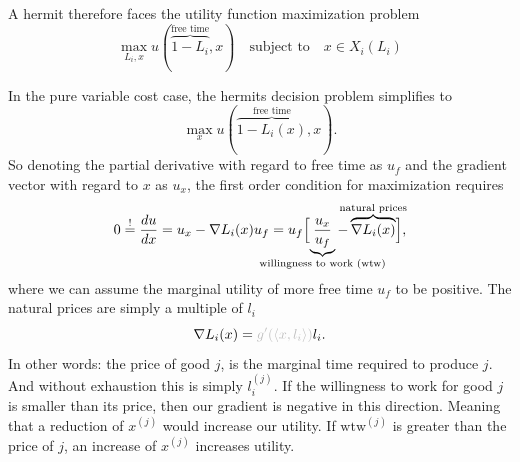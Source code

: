 A hermit therefore faces the utility function maximization problem
\[
	\max_{L_i, x} u(\overbrace{1-L_i}^{\text{free time}}, x)
	\quad\text{subject to}\quad x\in X_i(L_i)
\]


\begin{example*}
	In the pure variable cost case, the hermits decision problem simplifies to
	\[
		\max_{x} u(\overbrace{1-L_i(x)}^{\text{free time}}, x).
	\]
	So denoting the partial derivative with regard to free time as \(u_f\) and
	the gradient vector with regard to \(x\) as \(u_x\), the first order
	condition for maximization requires
	\[
		0\overset!=\frac{du}{dx}
		= u_x - \nabla L_i(x) u_f
		= u_f \Bigl[
			\underbrace{\frac{u_x}{u_f}}_{\mathclap{\text{willingness to work (wtw)}}}
		- \overbrace{\nabla L_i(x)}^{\mathclap{\text{natural prices}}}
		\Bigr],
	\]
	where we can assume the marginal utility of more free time \(u_f\) to be
	positive. The natural prices are simply {\color{lightgray} a multiple of}
	\(l_i\)
	\[
		\nabla L_i(x) = {\color{lightgray} g'(\langle x, l_i\rangle) }l_i.
	\]
	In other words: the price of good \(j\), is the {\color{lightgray} marginal}
	time required to produce \(j\). And without exhaustion this is simply
	\(l^{(j)}_i\). If the willingness to work for good \(j\) is smaller than
	its price, then our gradient is negative in this direction. Meaning that
	a reduction of \(x^{(j)}\) would increase our utility. If \(\text{wtw}^{(j)}\) is
	greater than the price of \(j\), an increase of \(x^{(j)}\) increases utility.
\end{example*}